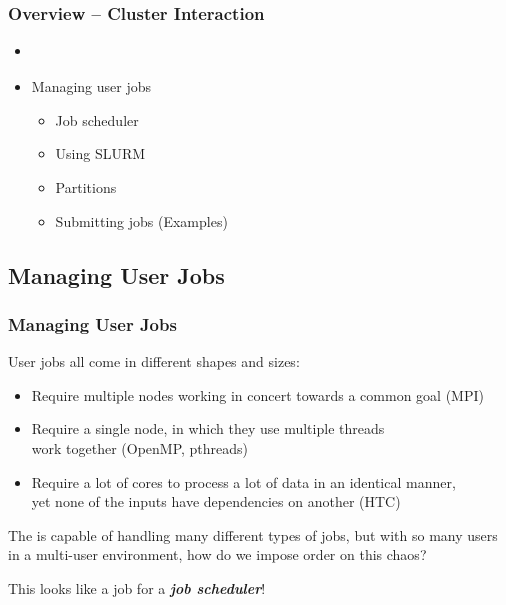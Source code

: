 \begin{frame}
	\frametitle{Overview -- Cluster Interaction}
	\begin{itemize}
		\item {}
			\begin{itemize}{}
			\end{itemize}
   {}
		\item Managing user jobs
		\begin{itemize}
			\item Job scheduler
			\item Using SLURM
			\item Partitions
			\item Submitting jobs (Examples)
		\end{itemize}		
	\end{itemize}
\end{frame}


\subsection{Managing User Jobs}
\begin{frame}
\frametitle{Managing User Jobs}
User jobs all come in different shapes and sizes:  
\begin{itemize}\footnotesize
	\item Require multiple nodes working in concert towards a common goal (MPI)
	\item Require a single node, in which they use multiple threads~\\work together (OpenMP, pthreads)
	\item Require a lot of cores to process a lot of data in an identical manner,~\\yet none of the inputs have dependencies on another (HTC)
\end{itemize}
\bigskip
The {\craycs} is capable of handling many different types of jobs, but with so many users in a multi-user environment, how do we impose order on this chaos?
\btVFill
\begin{center}This looks like a job for a \textbf{\emph{job scheduler}}!\end{center}
\end{frame}

